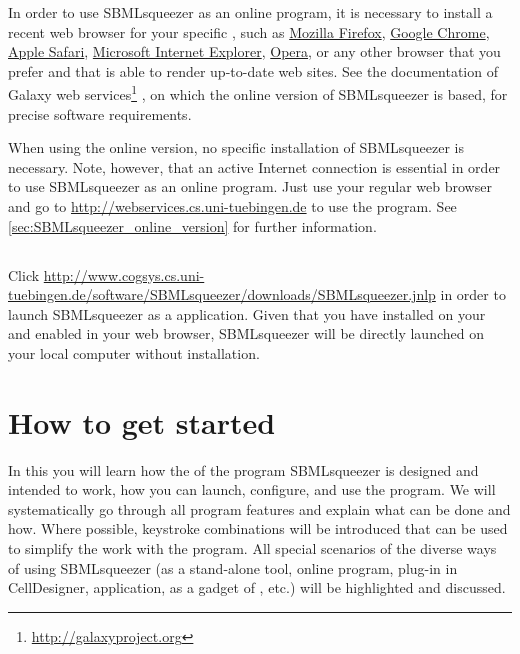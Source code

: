 In order to use SBMLsqueezer as an online program, it is necessary to install a recent web browser for your specific \OS, such as \href{http://www.mozilla.org}{Mozilla Firefox}, \href{https://www.google.com/intl/en/chrome/browser/}{Google Chrome}, \href{https://www.apple.com/safari/}{Apple Safari}, \href{http://windows.microsoft.com/en-us/internet-explorer/download-ie}{Microsoft Internet Explorer}, \href{http://www.opera.com/}{Opera}, or any other browser that you prefer and that is able to render up-to-date web sites.
See the documentation of Galaxy web services\footnote{\url{http://galaxyproject.org}} \citep{Goecks2010}, on which the online version of SBMLsqueezer is based, for precise software requirements.

When using the online version, no specific installation of SBMLsqueezer is necessary.
Note, however, that an active Internet connection is essential in order to use SBMLsqueezer as an online program.
Just use your regular web browser and go to \url{http://webservices.cs.uni-tuebingen.de} to use the program.
See \vref{sec:SBMLsqueezer_online_version} for further information.


\section{\JavaWebStart}

Click \url{http://www.cogsys.cs.uni-tuebingen.de/software/SBMLsqueezer/downloads/SBMLsqueezer.jnlp} in order to launch SBMLsqueezer as a \JavaWebStart application.
Given that you have \Java installed on your \OS and enabled in your web browser, SBMLsqueezer will be directly launched on your local computer without installation.



\chapter{How to get started}
\label{chap:GUI}

In this  you will learn how the \GUI of the program
SBMLsqueezer is designed and intended to work, how you can launch, configure,
and use the program.
We will systematically go through all program features and explain what can be done and how.
Where possible, keystroke combinations will be introduced that can be used to simplify the work with the program.
All special scenarios of the diverse ways of using SBMLsqueezer (as a stand-alone tool, online program, plug-in in CellDesigner, \JavaWebStart application, as a gadget of \Garuda, etc.) will be highlighted and discussed.

